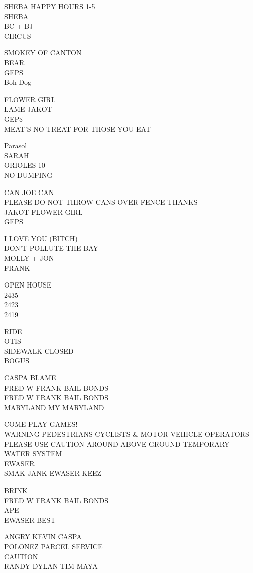 \documentclass[10pt,letterpaper]{article}
\begin{document}
SHEBA HAPPY HOURS 1{-}5\\
SHEBA\\
BC + BJ\\
CIRCUS

SMOKEY OF CANTON\\
BEAR\\
GEPS\\
Boh Dog

FLOWER GIRL\\
LAME JAKOT\\
GEP\$\\
MEAT'S NO TREAT FOR THOSE YOU EAT

Parasol\\
SARAH\\
ORIOLES 10\\
NO DUMPING

CAN JOE CAN\\
PLEASE DO NOT THROW CANS OVER FENCE THANKS\\
JAKOT FLOWER GIRL\\
GEPS

I LOVE YOU (BITCH)\\
DON'T POLLUTE THE BAY\\
MOLLY + JON\\
FRANK

OPEN HOUSE\\
2435\\
2423\\
2419

RIDE\\
OTIS\\
SIDEWALK CLOSED\\
BOGUS

CASPA BLAME\\
FRED W FRANK BAIL BONDS\\
FRED W FRANK BAIL BONDS\\
MARYLAND MY MARYLAND

COME PLAY GAMES!\\
WARNING PEDESTRIANS CYCLISTS \& MOTOR VEHICLE OPERATORS PLEASE USE CAUTION AROUND ABOVE{-}GROUND TEMPORARY WATER SYSTEM\\
EWASER\\
SMAK JANK EWASER KEEZ

BRINK\\
FRED W FRANK BAIL BONDS\\
APE\\
EWASER BEST

ANGRY KEVIN CASPA\\
POLONEZ PARCEL SERVICE\\
CAUTION\\
RANDY DYLAN TIM MAYA
\end{document}
